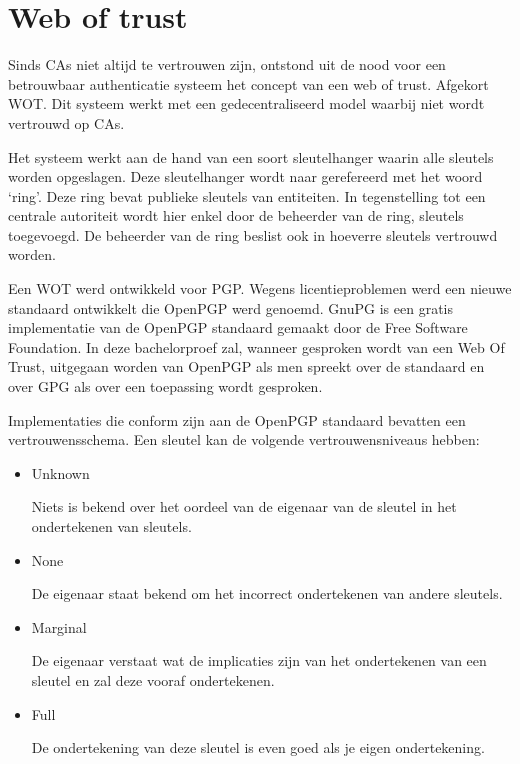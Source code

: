 \chapter{Web of trust}
\label{ch:web-of-trust}

Sinds CAs niet altijd te vertrouwen zijn, ontstond uit de nood voor een
betrouwbaar authenticatie systeem het concept van een web of trust. Afgekort
WOT. Dit systeem werkt met een gedecentraliseerd model waarbij niet wordt
vertrouwd op CAs.

Het systeem werkt aan de hand van een soort sleutelhanger waarin alle sleutels
worden opgeslagen. Deze sleutelhanger wordt naar gerefereerd met het woord
‘ring’. Deze ring bevat publieke sleutels van entiteiten. In tegenstelling tot
een centrale autoriteit wordt hier enkel door de beheerder van de ring, sleutels
toegevoegd. De beheerder van de ring beslist ook in hoeverre sleutels vertrouwd
worden.

Een WOT werd ontwikkeld voor \gls{PGP}. Wegens licentieproblemen
werd een nieuwe standaard ontwikkelt die \gls{OpenPGP} werd genoemd. GnuPG is een
gratis implementatie van de \gls{OpenPGP} standaard gemaakt door de Free Software
Foundation. In deze bachelorproef zal, wanneer gesproken wordt van een Web Of
Trust, uitgegaan worden van \gls{OpenPGP} als men spreekt over de standaard en over
\gls{GPG} als over een toepassing wordt gesproken.

Implementaties die conform zijn aan de \gls{OpenPGP} standaard bevatten een
vertrouwensschema. Een sleutel kan de volgende vertrouwensniveaus hebben:

\begin{itemize}
	\item Unknown

	Niets is bekend over het oordeel van de eigenaar van de sleutel in het
	ondertekenen van sleutels.

	\item None

	De eigenaar staat bekend om het incorrect ondertekenen van andere sleutels.

	\item Marginal

	De eigenaar verstaat wat de implicaties zijn van het ondertekenen van een
	sleutel en zal deze vooraf ondertekenen.

	\item Full

	De ondertekening van deze sleutel is even goed als je eigen ondertekening.
	\autocite{GNUManual}
\end{itemize}

